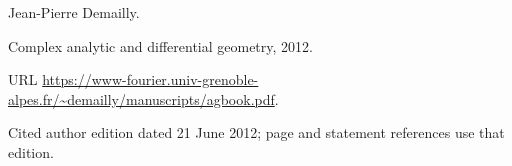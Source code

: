Jean-Pierre Demailly.

\newblock Complex analytic and differential geometry, 2012.

\newblock URL
  \url{https://www-fourier.univ-grenoble-alpes.fr/~demailly/manuscripts/agbook.pdf}.

\newblock Cited author edition dated 21 June 2012; page and statement references use that edition.
